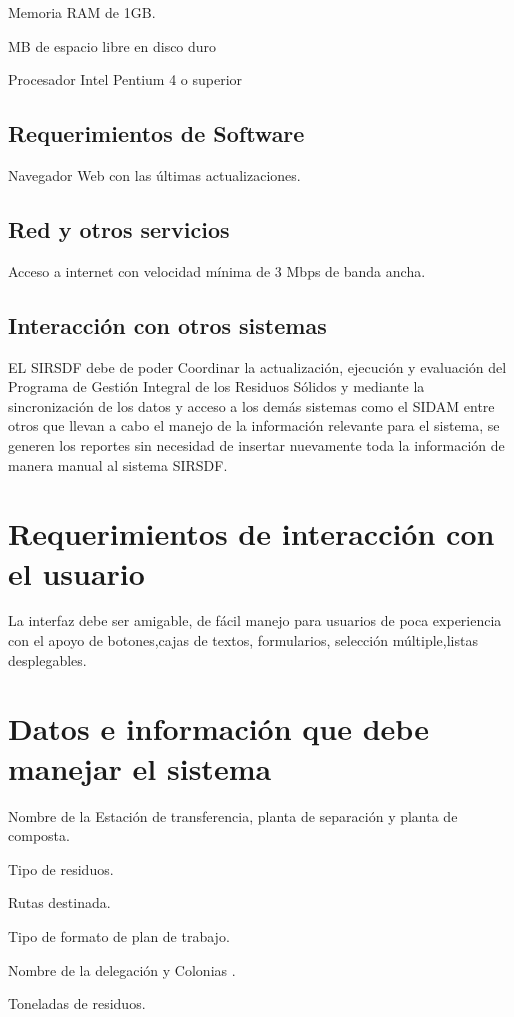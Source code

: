 \textbullet Memoria RAM de 1GB.

 MB de espacio libre en disco duro

\textbullet Procesador Intel Pentium 4 o superior
\subsection{Requerimientos de Software}
Navegador Web con las últimas actualizaciones.

\subsection{Red y otros servicios}

Acceso a internet con velocidad mínima de 3 Mbps de banda ancha.
\subsection{Interacción con otros sistemas}
EL SIRSDF debe de poder Coordinar la actualización, ejecución y evaluación del Programa de Gestión Integral de los Residuos Sólidos y mediante la sincronización de los datos y acceso a los demás sistemas como el SIDAM entre otros que llevan a cabo el manejo de la información relevante para el sistema, se generen los reportes sin necesidad de insertar nuevamente toda la información de manera manual al sistema SIRSDF.

\section{Requerimientos de interacción con el usuario}
La interfaz debe ser amigable, de fácil manejo para usuarios de poca experiencia con el apoyo de botones,cajas de textos, formularios, selección múltiple,listas desplegables.


\section{Datos e información que debe manejar el sistema}
\textbullet Nombre de la Estación de transferencia, planta de separación y planta de 	composta.

\textbullet Tipo de residuos.

\textbullet Rutas destinada.

\textbullet Tipo de formato de plan de trabajo.

\textbullet Nombre de la delegación y Colonias . 

\textbullet Toneladas de residuos.


